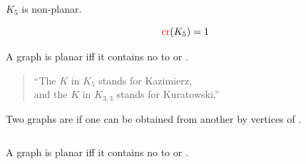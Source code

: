 \begin{frame}{}
  \begin{theorem}
    $K_{5}$ is non-planar.
  \end{theorem}

  \pause

  \pause
  \vspace{-0.60cm}
  \[
    \textcolor{red}{\text{cr}}(K_{5}) = 1
  \]
\end{frame}

\begin{frame}{}
  \begin{theorem}
    A graph is planar iff it contains no 
     to  or .
  \end{theorem}

  \pause

  \pause
  \begin{quote}
    \begin{center}
      ``The $K$ in $K_{5}$ stands for Kazimierz,\\
      and the $K$ in $K_{3, 3}$ stands for Kuratowski.''
    \end{center}
  \end{quote}
\end{frame}

\begin{frame}{}
  \begin{definition}[Homeomorphic]
    Two graphs are  if
    one can be obtained from another by 
    vertices of .
  \end{definition}

  \pause
  \begin{columns}
  \end{columns}
\end{frame}

\begin{frame}{}
  \begin{theorem}
    A graph is planar iff it contains no 
     to  or .
  \end{theorem}

  \begin{columns}
      \pause
      \pause
  \end{columns}
\end{frame}

